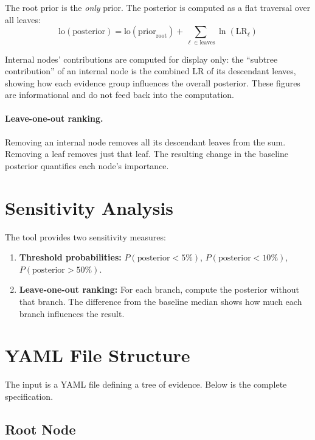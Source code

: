 \documentclass[11pt,a4paper]{article}
\begin{document}
The root prior is the \emph{only} prior.  The posterior is computed as a flat
traversal over all leaves:
\begin{equation}
\text{lo}(\text{posterior}) = \text{lo}(\text{prior}_{\text{root}})
  + \sum_{\ell \in \text{leaves}} \ln(\text{LR}_\ell)
\end{equation}

Internal nodes' contributions are computed for display only: the
``subtree contribution'' of an internal node is the combined LR of its
descendant leaves, showing how each evidence group influences the overall
posterior.  These figures are informational and do not feed back into the
computation.

\paragraph{Leave-one-out ranking.}
Removing an internal node removes all its descendant leaves from the sum.
Removing a leaf removes just that leaf.  The resulting change in the baseline
posterior quantifies each node's importance.

\section{Sensitivity Analysis}
\label{sec:sensitivity}

The tool provides two sensitivity measures:
\begin{enumerate}
\item \textbf{Threshold probabilities:} $P(\text{posterior} < 5\%)$,
  $P(\text{posterior} < 10\%)$, $P(\text{posterior} > 50\%)$.
\item \textbf{Leave-one-out ranking:} For each branch, compute the posterior
  without that branch. The difference from the baseline median shows how much
  each branch influences the result.
\end{enumerate}

\section{YAML File Structure}

The input is a YAML file defining a tree of evidence. Below is the complete
specification.

\subsection{Root Node}
\end{document}
